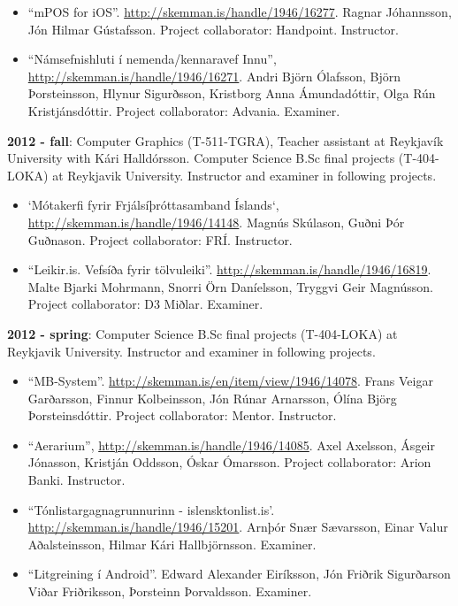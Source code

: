 \begin{itemize}
\item ``mPOS for iOS''. \url{http://skemman.is/handle/1946/16277}. Ragnar
    Jóhannsson, Jón Hilmar Gústafsson. Project collaborator: Handpoint.
        Instructor.

\item ``Námsefnishluti í nemenda/kennaravef Innu'',
    \url{http://skemman.is/handle/1946/16271}. Andri Björn Ólafsson, Björn
        Þorsteinsson, Hlynur Sigurðsson, Kristborg Anna Ámundadóttir, Olga Rún
        Kristjánsdóttir. Project collaborator: Advania. Examiner. 
\end{itemize}


\textbf{2012 - fall}:
Computer Graphics (T-511-TGRA), Teacher assistant at Reykjavík University with
Kári Halldórsson. Computer Science B.Sc final projects (T-404-LOKA) at
Reykjavik University. Instructor and examiner in following projects.

\begin{itemize}
\item `Mótakerfi fyrir Frjálsíþróttasamband Íslands`,
    \url{http://skemman.is/handle/1946/14148}. Magnús Skúlason, Guðni Þór
        Guðnason. Project collaborator: FRÍ. Instructor.

\item ``Leikir.is. Vefsíða fyrir tölvuleiki''.
    \url{http://skemman.is/handle/1946/16819}. Malte Bjarki Mohrmann, Snorri
        Örn Daníelsson, Tryggvi Geir Magnússon. Project collaborator: D3
        Miðlar. Examiner.
\end{itemize}


\textbf{2012 - spring}:
Computer Science B.Sc final projects (T-404-LOKA) at Reykjavik University.
Instructor and examiner in following projects.

\begin{itemize}
\item ``MB-System''. \url{http://skemman.is/en/item/view/1946/14078}. Frans
    Veigar Garðarsson, Finnur Kolbeinsson, Jón Rúnar Arnarsson, Ólína Björg
        Þorsteinsdóttir. Project collaborator: Mentor. Instructor.

\item ``Aerarium'', \url{http://skemman.is/handle/1946/14085}. Axel Axelsson,
    Ásgeir Jónasson, Kristján Oddsson, Óskar Ómarsson. Project collaborator:
        Arion Banki. Instructor.

\item ``Tónlistargagnagrunnurinn - islensktonlist.is'.
    \url{http://skemman.is/handle/1946/15201}. Arnþór Snær Sævarsson, Einar
        Valur Aðalsteinsson, Hilmar Kári Hallbjörnsson. Examiner.

\item ``Litgreining í Android''. Edward Alexander Eiríksson, Jón Friðrik
    Sigurðarson Viðar Friðriksson, Þorsteinn Þorvaldsson. Examiner.
\end{itemize}


